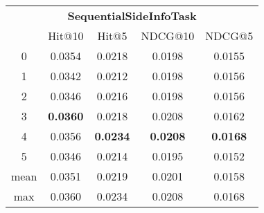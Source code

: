 \documentclass{article}
\begin{document}
 

\begin{tabular}{c|cccc}

\multicolumn{5}{c}{\textbf{SequentialSideInfoTask}} \\
\noalign{\smallskip}
\noalign{\smallskip}
\toprule
\multicolumn{1}{c}{Template ID} & \multicolumn{1}{|c}{Hit@10} & \multicolumn{1}{c}{Hit@5} & \multicolumn{1}{c}{NDCG@10} & \multicolumn{1}{c}{NDCG@5} \\
\midrule
0 & 0.0354 & 0.0218 & 0.0198 & 0.0155 \\
1 & 0.0342 & 0.0212 & 0.0198 & 0.0156 \\
2 & 0.0346 & 0.0216 & 0.0198 & 0.0156 \\
3 & \textbf{0.0360} & 0.0218 & 0.0208 & 0.0162 \\
4 & 0.0356 & \textbf{0.0234} & \textbf{0.0208} & \textbf{0.0168} \\
5 & 0.0346 & 0.0214 & 0.0195 & 0.0152 \\
\midrule
mean & 0.0351 & 0.0219 & 0.0201 & 0.0158 \\
max & 0.0360 & 0.0234 & 0.0208 & 0.0168 \\
\bottomrule

\end{tabular}
\end{document}
